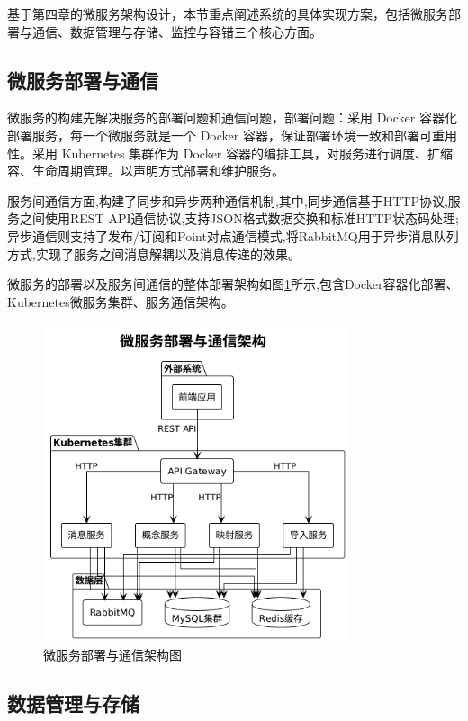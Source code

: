 基于第四章的微服务架构设计，本节重点阐述系统的具体实现方案，包括微服务部署与通信、数据管理与存储、监控与容错三个核心方面。

\subsection{微服务部署与通信}

微服务的构建先解决服务的部署问题和通信问题，部署问题：采用 Docker 容器化部署服务，每一个微服务就是一个 Docker 容器，保证部署环境一致和部署可重用性。采用 Kubernetes 集群作为 Docker 容器的编排工具，对服务进行调度、扩缩容、生命周期管理。以声明方式部署和维护服务。

服务间通信方面,构建了同步和异步两种通信机制,其中,同步通信基于HTTP协议,服务之间使用REST API通信协议,支持JSON格式数据交换和标准HTTP状态码处理;异步通信则支持了发布/订阅和Point对点通信模式,将RabbitMQ用于异步消息队列方式,实现了服务之间消息解耦以及消息传递的效果。

微服务的部署以及服务间通信的整体部署架构如图\ref{fig:microservice_deployment}所示,包含Docker容器化部署、Kubernetes微服务集群、服务通信架构。

\begin{figure}[H]
    \centering
    \includegraphics[width=0.8\textwidth]{chapters/fig-0/microservice_deployment.png}
    \caption{微服务部署与通信架构图}
    \label{fig:microservice_deployment}
\end{figure}

\subsection{数据管理与存储}

